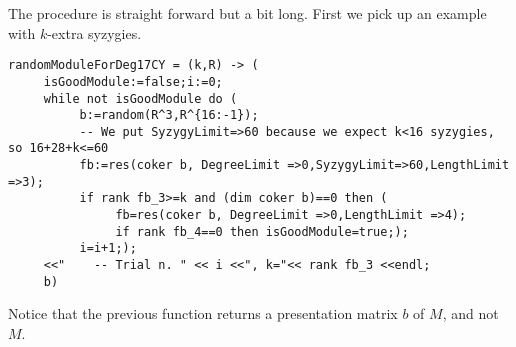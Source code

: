 \documentclass[12pt,leqno]{amsart}
\begin{document}
The procedure is straight forward but a bit long. 
First we pick up an example with $k$-extra syzygies.
{\scriptsize
\begin{verbatim}
randomModuleForDeg17CY = (k,R) -> (
     isGoodModule:=false;i:=0;
     while not isGoodModule do (
          b:=random(R^3,R^{16:-1});
          -- We put SyzygyLimit=>60 because we expect k<16 syzygies, so 16+28+k<=60
          fb:=res(coker b, DegreeLimit =>0,SyzygyLimit=>60,LengthLimit =>3);
          if rank fb_3>=k and (dim coker b)==0 then (
               fb=res(coker b, DegreeLimit =>0,LengthLimit =>4);
               if rank fb_4==0 then isGoodModule=true;);
          i=i+1;);
     <<"    -- Trial n. " << i <<", k="<< rank fb_3 <<endl;
     b)
\end{verbatim}}
Notice that the previous function returns a presentation matrix $b$ of $M$, 
and not $M$.
\end{document}
